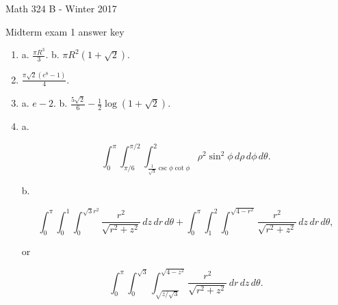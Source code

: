 \documentclass[12 pt]{report}
\begin{document}
\noindent \vfill \noindent 

\centerline{Math 324 B  - Winter 2017}

\centerline{Midterm exam 1 answer key}

\begin{enumerate} \item a. $\frac{\pi R^3}{3}$. b. $\pi R^2 (1+ \sqrt{2})$. 

\item $\frac{\pi \sqrt{2}(e^8-1)}{4}.$

\item a. $e-2$. b. $\frac{5 \sqrt{2}}{6} - \frac{1}{2} \log(1+\sqrt{2}).$

\item a.

\[
\int_0^\pi \int_{\pi/6}^{\pi/2} \int_{\frac{1}{\sqrt{3}} \csc \phi \cot \phi}^2 \rho^2 \sin^2 \phi \, d\rho \, d\phi \, d\theta.
\]

b. 

\[
\int_0^\pi \int_0^1 \int_0^{\sqrt{3}r^2} \frac{r^2}{\sqrt{r^2+z^2}} \, dz \, dr \, d\theta + \int_0^\pi \int_1^2 \int_0^{\sqrt{4-r^2}} \frac{r^2}{\sqrt{r^2+z^2}} \, dz \, dr \, d\theta,
\]

or 

\[
\int_0^\pi \int_0^{\sqrt{3}} \int_{\sqrt{z/\sqrt{3}}}^{\sqrt{4-z^2}} \frac{r^2}{\sqrt{r^2+z^2}} \, dr \, dz \, d\theta.
\]

\end{enumerate}
\end{document}
